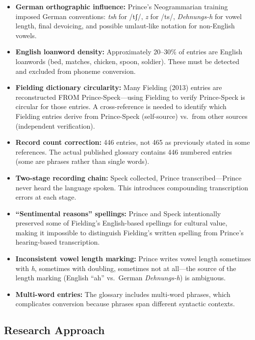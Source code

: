 \begin{itemize}
  \item \textbf{German orthographic influence:} Prince's Neogrammarian
    training imposed German conventions: \textit{tsh} for /tʃ/, \textit{z}
    for /ts/, \textit{Dehnungs-h} for vowel length, final devoicing, and
    possible umlaut-like notation for non-English vowels.
  \item \textbf{English loanword density:} Approximately 20--30\% of entries
    are English loanwords (bed, matches, chicken, spoon, soldier). These must
    be detected and excluded from phoneme conversion.
  \item \textbf{Fielding dictionary circularity:} Many Fielding (2013) entries
    are reconstructed FROM Prince-Speck---using Fielding to verify
    Prince-Speck is circular for those entries. A cross-reference is needed
    to identify which Fielding entries derive from Prince-Speck
    (self-source) vs.\ from other sources (independent verification).
  \item \textbf{Record count correction:} 446 entries, not 465 as previously
    stated in some references. The actual published glossary contains 446
    numbered entries (some are phrases rather than single words).
  \item \textbf{Two-stage recording chain:} Speck collected, Prince
    transcribed---Prince never heard the language spoken. This introduces
    compounding transcription errors at each stage.
  \item \textbf{``Sentimental reasons'' spellings:} Prince and Speck
    intentionally preserved some of Fielding's English-based spellings for
    cultural value, making it impossible to distinguish Fielding's written
    spelling from Prince's hearing-based transcription.
  \item \textbf{Inconsistent vowel length marking:} Prince writes vowel
    length sometimes with \textit{h}, sometimes with doubling, sometimes not
    at all---the source of the length marking (English ``ah'' vs.\ German
    \textit{Dehnungs-h}) is ambiguous.
  \item \textbf{Multi-word entries:} The glossary includes multi-word phrases,
    which complicates conversion because phrases span different syntactic
    contexts.
\end{itemize}

\subsection{Research Approach}

